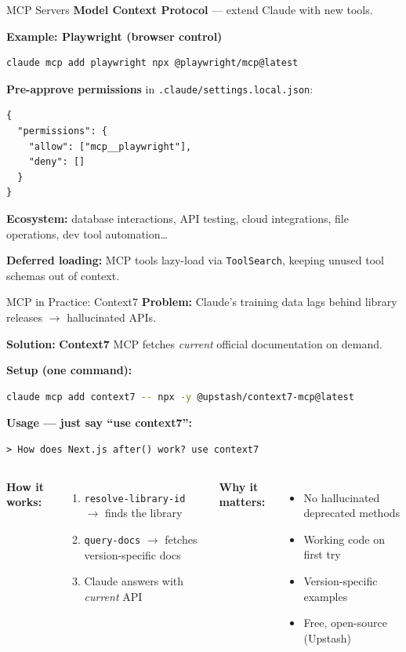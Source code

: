 \documentclass[aspectratio=169]{beamer}
\begin{document}
\begin{frame}[fragile]{MCP Servers}
\textbf{Model Context Protocol} --- extend Claude with new tools.

\bigskip
\textbf{Example: Playwright (browser control)}
\begin{lstlisting}[language=bash]
claude mcp add playwright npx @playwright/mcp@latest
\end{lstlisting}

\textbf{Pre-approve permissions} in \texttt{.claude/settings.local.json}:
\begin{lstlisting}[]
{
  "permissions": {
    "allow": ["mcp__playwright"],
    "deny": []
  }
}
\end{lstlisting}

\bigskip
\textbf{Ecosystem:} database interactions, API testing, cloud integrations, file operations, dev tool automation\ldots

\textbf{Deferred loading:} MCP tools lazy-load via \texttt{ToolSearch}, keeping unused tool schemas out of context.
\end{frame}

\begin{frame}[fragile]{MCP in Practice: Context7}
\textbf{Problem:} Claude's training data lags behind library releases $\to$ hallucinated APIs.

\textbf{Solution:} \textbf{Context7} MCP fetches \emph{current} official documentation on demand.

\smallskip
\textbf{Setup (one command):}
\begin{lstlisting}[language=bash]
claude mcp add context7 -- npx -y @upstash/context7-mcp@latest
\end{lstlisting}

\textbf{Usage --- just say ``use context7'':}
\begin{lstlisting}[]
> How does Next.js after() work? use context7
\end{lstlisting}

\begin{columns}[T]
\textbf{\color{popblue}How it works:}
\begin{enumerate}
  \item \texttt{resolve-library-id} $\to$ finds the library
  \item \texttt{query-docs} $\to$ fetches version-specific docs
  \item Claude answers with \emph{current} API
\end{enumerate}

\textbf{\color{paramgreen}Why it matters:}
\begin{itemize}
  \item No hallucinated deprecated methods
  \item Working code on first try
  \item Version-specific examples
  \item Free, open-source (Upstash)
\end{itemize}
\end{columns}
\end{frame}
\end{document}
